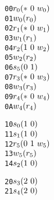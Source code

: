 \newsavebox{\boxTZero}
\begin{lrbox}{\boxTZero}
\begin{minipage}[t]{0.4\linewidth}
\large
\begin{alltt}
00 \(r\sb{0}(\ast\ 0\ w\sb{0})\)
01 \(w\sb{0}(r\sb{0})\)
02 \(r\sb{1}(\ast\ 0\ w\sb{1})\)
03 \(w\sb{1}(r\sb{1})\)
04 \(r\sb{2}(1\ 0\ w\sb{2})\)
05 \(w\sb{2}(r\sb{2})\)
06 \(s\sb{5}(0\ 1)\)
07 \(r\sb{3}(\ast\ 0\ w\sb{3})\)
08 \(w\sb{3}(r\sb{3})\)
09 \(r\sb{4}(\ast\ 0\ w\sb{4})\)
0A \(w\sb{4}(r\sb{4})\)


\end{alltt}
\end{minipage}
\end{lrbox}

\newsavebox{\boxTOne}
\begin{lrbox}{\boxTOne}
\begin{minipage}[t]{0.4\linewidth}
\large
\begin{alltt}
10 \(s\sb{0}(1\ 0)\)
11 \(s\sb{1}(1\ 0)\)
12 \(r\sb{5}(0\ 1\ w\sb{5})\)
13 \(w\sb{5}(r\sb{5})\)
14 \(s\sb{2}(1\ 0)\)
\end{alltt}
\end{minipage}
\end{lrbox}

\newsavebox{\boxTTwo}
\begin{lrbox}{\boxTTwo}
\begin{minipage}[t]{0.4\linewidth}
\large
\begin{alltt}
20 \(s\sb{3}(2\ 0)\)
21 \(s\sb{4}(2\ 0)\)\end{alltt}
\end{minipage}
\end{lrbox}


\newcommand\examplefigone{
\begin{figure*}[tb]
\begin{center}
\setlength{\tabcolsep}{2pt}
\begin{tabular}[t]{c|c|c}
$\mathit{p_1}$ & $\mathit{p_2}$ & $\mathit{p_3}$ \\
\hline
\scalebox{0.8}{\usebox{\boxTZero}}&
\scalebox{0.8}{\usebox{\boxTOne}} &
\scalebox{0.8}{\usebox{\boxTTwo}}\\
\end{tabular}
\end{center}
\caption{A simple concurrent trace program.}
\label{fig:example}
\end{figure*}
}
